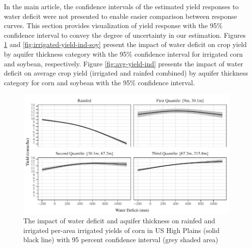 \documentclass[
]{article}
\begin{document}
\setcounter{figure}{0}
\renewcommand{\thefigure}{A.\arabic{figure}}

In the main article, the confidence intervals of the estimated yield responses to water deficit were not presented to enable easier comparison between response curves. This section provides visualization of yield response with the 95\% confidence interval to convey the degree of uncertainty in our estimation. Figures \ref{fig:irrigated-yield-ind-corn} and \ref{fig:irrigated-yield-ind-soy} present the impact of water deficit on crop yield by aquifer thickness category with the 95\% confidence interval for irrigated corn and soybean, respectively. Figure \ref{fig:avg-yield-ind} presents the impact of water deficit on average crop yield (irrigated and rainfed combined) by aquifer thickness category for corn and soybean with the 95\% confidence interval.

\begin{figure}[H]

{\centering \includegraphics[width=6in,]{Figures/g_yield_with_conf_corn} 

}

\caption{The impact of water deficit and aquifer thickness on rainfed and irrigated per-area irrigated yields of corn in US High Plains (solid black line) with 95 percent confidence interval (grey shaded area)}\label{fig:irrigated-yield-ind-corn}
\end{figure}
\end{document}
